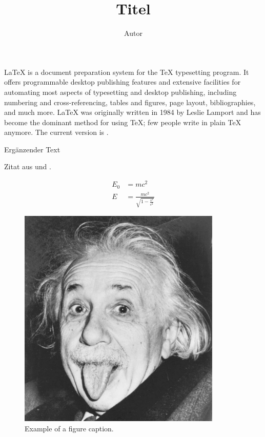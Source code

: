 \documentclass{scrarticle}
\title{{{Titel}}}
\author{{{Autor}}}
\begin{document}
\maketitle

\LaTeX{} is a document preparation system for the \TeX{} typesetting program. It offers programmable desktop publishing features and extensive facilities for automating most aspects of typesetting and desktop publishing, including numbering and  cross-referencing, tables and figures, page layout, bibliographies, and much more. \LaTeX{} was originally written in 1984 by Leslie Lamport and has become the  dominant method for using \TeX; few people write in plain \TeX{} anymore. The current version is \LaTeXe.

{{Ergänzender Text }}

Zitat aus \cite{scheme} und \cite[17]{knuth}.

\begin{align}
E_0 &= mc^2 \\
E &= \frac{mc^2}{\sqrt{1-\frac{v^2}{c^2}}}
\end{align}

\begin{figure}[htbp]
\centerline{\includegraphics[width=0.3\linewidth]{einstein}}
\caption{Example of a figure caption.}
\label{fig}
\end{figure}



\printbibliography
\end{document}
